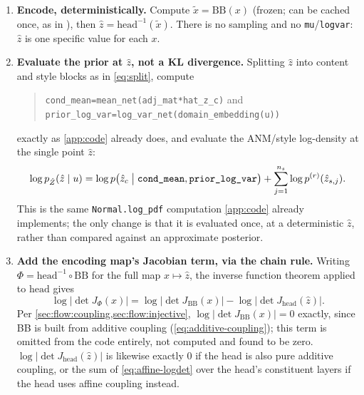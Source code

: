 \begin{enumerate}[label=(\arabic*),leftmargin=2em]
\item \textbf{Encode, deterministically.} Compute $\tilde x=\mathrm{BB}(x)$ (frozen; can be cached once,
      as in ), then $\hat z=\mathrm{head}^{-1}(\tilde x)$. There is no sampling and no
      \texttt{mu}/\texttt{logvar}: $\hat z$ is one specific value for each $x$.
\item \textbf{Evaluate the prior at $\hat z$, not a KL divergence.} Splitting $\hat z$ into content and
      style blocks as in \cref{eq:split}, compute
      \begin{quote}
      \texttt{cond\_mean=mean\_net(adj\_mat*hat\_z\_c)} and \\
      \texttt{prior\_log\_var=log\_var\_net(domain\_embedding(u))}
      \end{quote}
      exactly as \cref{app:code} already does, and evaluate the ANM/style log-density at the single point
      $\hat z$:
      \begin{equation}
      \log p_{\hat Z}(\hat z\mid u) = \log p\bigl(\hat z_c\bigm|\texttt{cond\_mean},\texttt{prior\_log\_var}\bigr)
      + \sum_{j=1}^{n_s}\log p^{(r)}(\hat z_{s,j}).
      \label{eq:flow-prior-term}
      \end{equation}
      This is the same \texttt{Normal.log\_pdf} computation \cref{app:code} already implements; the only
      change is that it is evaluated once, at a deterministic $\hat z$, rather than compared against an
      approximate posterior.
\item \textbf{Add the encoding map's Jacobian term, via the chain rule.} Writing
      $\Phi=\mathrm{head}^{-1}\circ\mathrm{BB}$ for the full map $x\mapsto\hat z$, the inverse function
      theorem applied to $\mathrm{head}$ gives
      \begin{equation}
      \log\bigl|\det J_\Phi(x)\bigr| = \log\bigl|\det J_{\mathrm{BB}}(x)\bigr|
      - \log\bigl|\det J_{\mathrm{head}}(\hat z)\bigr|.
      \label{eq:flow-jac-split}
      \end{equation}
      Per \cref{sec:flow:coupling,sec:flow:injective}, $\log|\det J_{\mathrm{BB}}(x)|=0$ exactly, since BB
      is built from additive coupling (\cref{eq:additive-coupling}); this term is omitted from the code
      entirely, not computed and found to be zero. $\log|\det J_{\mathrm{head}}(\hat z)|$ is likewise
      exactly $0$ if the head is also pure additive coupling, or the sum of \cref{eq:affine-logdet} over
      the head's constituent layers if the head uses affine coupling instead.

\end{enumerate}
